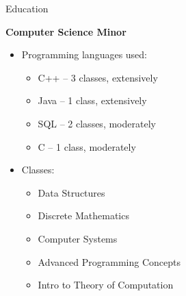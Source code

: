 \documentclass{resume}
\begin{document}
\begin{rSection}{Education}
\begin{rSubsection}
        \item \textbf{Computer Science Minor}%
            \begin{itemize}[label = $\vspace{0ex}$, itemsep=-5pt,topsep=-3pt]
                \item Programming languages used:
                    \begin{multicols}{2}
                    \begin{itemize}[noitemsep, topsep=-7pt, label=$\cdot$]
                        \item C++ -- 3 classes, extensively
                        \item Java -- 1 class, extensively
                        \item SQL -- 2 classes, moderately
                        \item C -- 1 class, moderately
                    \end{itemize}
                    \end{multicols}
                \item Classes:
                \begin{multicols}{2}
                \begin{itemize}[nosep, label=$\cdot$]
                    \item Data Structures
                    \item Discrete Mathematics
                    \item Computer Systems
                    \item Advanced Programming Concepts
                    \item Intro to Theory of Computation
                \end{itemize}
                \end{multicols}
            \end{itemize}
    \end{rSubsection}
\end{rSection}
\end{document}
